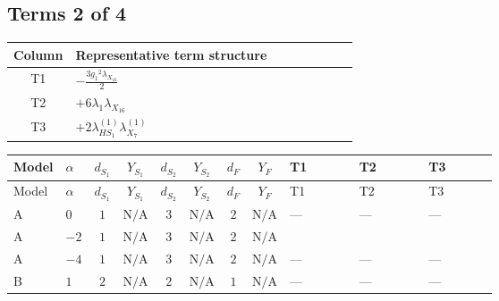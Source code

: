 \documentclass[8pt]{article}
\begin{document}
\begin{landscape}
\subsection*{Terms 2 of 4}
\begin{center}
\begin{tabular}{@{}c >{\raggedright\arraybackslash}p{0.82\linewidth}@{}}
\toprule
Column & Representative term structure \\
\midrule
T1 & \(\displaystyle -\frac{3 {g_1}^2 {\lambda_{X_{16}}}}{2}\) \\
\midrule
T2 & \(\displaystyle +6 {\lambda_1} {\lambda_{X_{16}}}\) \\
\midrule
T3 & \(\displaystyle +2 {\lambda_{HS_1}^{(1)}} {\lambda_{X_{7}}^{(1)}}\) \\
\midrule
\bottomrule
\end{tabular}
\end{center}
\smallskip
\tiny
\begin{longtable}{@{}llcccccc >{\raggedright\arraybackslash}p{0.21\linewidth} >{\raggedright\arraybackslash}p{0.21\linewidth} >{\raggedright\arraybackslash}p{0.21\linewidth}@{}}
\toprule
Model & $\alpha$ & $d_{S_1}$ & $Y_{S_1}$ & $d_{S_2}$ & $Y_{S_2}$ & $d_F$ & $Y_F$ & T1 & T2 & T3 \\
\midrule
\endfirsthead
\toprule
Model & $\alpha$ & $d_{S_1}$ & $Y_{S_1}$ & $d_{S_2}$ & $Y_{S_2}$ & $d_F$ & $Y_F$ & T1 & T2 & T3 \\
\midrule
\endhead
A & $0$ & $1$ & $\text{N/A}$ & $3$ & $\text{N/A}$ & $2$ & $\text{N/A}$ & --- & --- & --- \\
\midrule
A & $-2$ & $1$ & $\text{N/A}$ & $3$ & $\text{N/A}$ & $2$ & $\text{N/A}$ & \scriptsize\adjustbox{max width=\linewidth}{$\begin{gathered} -\frac{3 {g_1}^2 {\lambda_{X_{16}}}}{2}\end{gathered}$} & \scriptsize\adjustbox{max width=\linewidth}{$\begin{gathered} +6 {\lambda_1} {\lambda_{X_{16}}}\end{gathered}$} & \scriptsize\adjustbox{max width=\linewidth}{$\begin{gathered} +2 {\lambda_{HS_1}^{(1)}} {\lambda_{X_{7}}^{(1)}}\end{gathered}$} \\
\midrule
A & $-4$ & $1$ & $\text{N/A}$ & $3$ & $\text{N/A}$ & $2$ & $\text{N/A}$ & --- & --- & --- \\
\midrule
B & $1$ & $2$ & $\text{N/A}$ & $2$ & $\text{N/A}$ & $1$ & $\text{N/A}$ & --- & --- & --- \\

\end{longtable}
\end{landscape}
\end{document}
